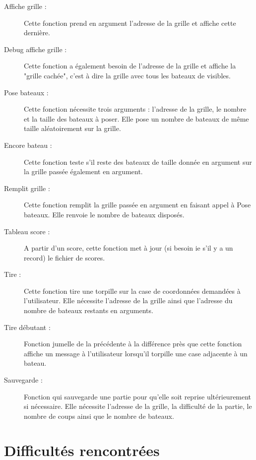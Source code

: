 \documentclass[french]{article}
\begin{document}
\begin{description}

\item[Affiche grille :] Cette fonction prend en argument l'adresse de la grille et affiche cette dernière.

\item[Debug affiche grille :] Cette fonction a également besoin de l'adresse de la grille et affiche la "grille cachée", c'est à dire la grille avec tous les bateaux de visibles.

\item[Pose bateaux :] Cette fonction nécessite trois arguments : l'adresse de la grille, le nombre et la taille des bateaux à poser. Elle pose un nombre de bateaux de même taille aléatoirement sur la grille.

\item[Encore bateau :] Cette fonction teste s'il reste des bateaux de taille donnée en argument sur la grille passée également en argument.

\item[Remplit grille :] Cette fonction remplit la grille passée en argument en faisant appel à Pose bateaux. Elle renvoie le nombre de bateaux disposés. 

\item[Tableau score :] A partir d'un score, cette fonction met à jour (si besoin ie s'il y a un record) le fichier de scores. 

\item[Tire :] Cette fonction tire une torpille sur la case de coordonnées demandées à l'utilisateur. Elle nécessite l'adresse de la grille ainsi que l'adresse du nombre de bateaux restants en arguments.

\item[Tire débutant :] Fonction jumelle de la précédente à la différence près que cette fonction affiche un message à l'utilisateur lorsqu'il torpille une case adjacente à un bateau.

\item[Sauvegarde :] Fonction qui sauvegarde une partie pour qu'elle soit reprise ultérieurement si nécessaire. Elle nécessite l'adresse de la grille, la difficulté de la partie, le nombre de coups ainsi que le nombre de bateaux.

\end{description}

\section{Difficultés rencontrées}
\end{document}
